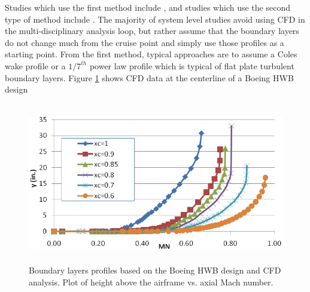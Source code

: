 \documentclass[12pt]{gatech-thesis}
\begin{document}
Studies which use the first method include \cite{Sato2011} \cite{Plas2007}, and studies which use the second type of method include  \cite{Felder2011} \cite{Hardin2012} \cite{Kawai2006}.  The majority of system level studies avoid using CFD in the multi-disciplinary analysis loop, but rather assume that the boundary layers do not change much from the cruise point and simply use those profiles as a starting point.  From the first method, typical approaches are to assume a Coles wake profile or a $1/7^{th}$ power law profile which is typical of flat plate turbulent boundary layers.  Figure \ref{Boundary_Layer_Profiles} shows CFD data at the centerline of a Boeing HWB design \cite{Felder2011}
	\begin{figure}
	\centering
	\includegraphics[width=120mm, height =70mm, clip=true]{Figure8_Boundary_Layers.png}
	\caption{Boundary layers profiles based on the Boeing HWB design and CFD analysis.  Plot of height above the airframe vs. axial Mach number. \cite{Fedler2011}}
	\label{Boundary_Layer_Profiles}
	\end{figure}
\end{document}
